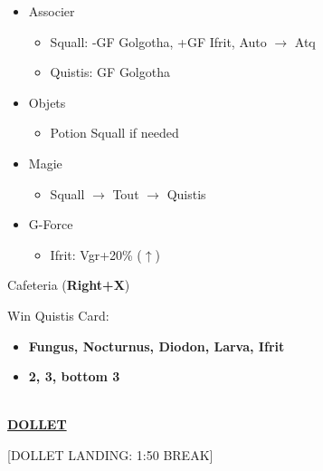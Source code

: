 \begin{menu}
	\begin{itemize}
		\item Associer
			\begin{itemize}
				\item Squall: -GF Golgotha, +GF Ifrit, Auto $\rightarrow$ Atq
				\item Quistis: GF Golgotha
			\end{itemize}
		\item Objets
			\begin{itemize}
				\item Potion Squall if needed
			\end{itemize}
		\item Magie
			\begin{itemize}
				\item Squall $\rightarrow$ Tout $\rightarrow$ Quistis
			\end{itemize}
		\item G-Force
			\begin{itemize}
				\item Ifrit: Vgr+20\% ($\uparrow$)
			\end{itemize}
	\end{itemize}
\end{menu}

Cafeteria (\textbf{Right+X})

Win Quistis Card:
\begin{itemize}
	\item \textbf{Fungus, Nocturnus, Diodon, Larva, Ifrit}
	\item \textbf{2, 3, bottom 3}
\end{itemize}

\leavevmode\\
\underline{\textbf{DOLLET}}

[DOLLET LANDING: 1:50 BREAK]

